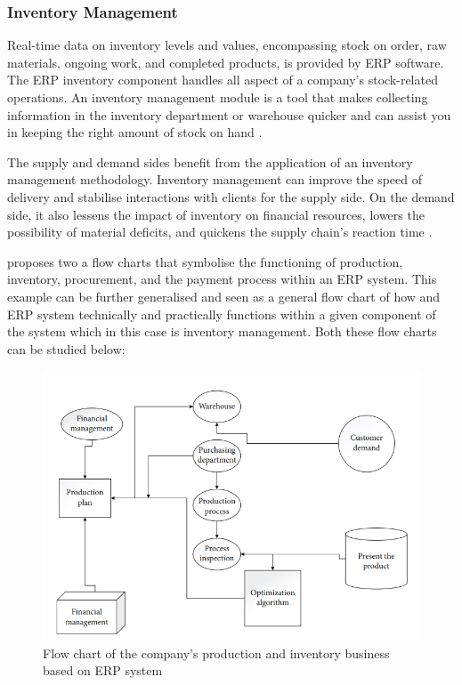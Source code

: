 \subsubsection{Inventory Management}
\par{Real-time data on inventory levels and values, encompassing stock on order, raw materials, ongoing work, and completed products, is provided by ERP software. The ERP inventory component handles all aspect of a company's stock-related operations. An inventory management module is a tool that makes collecting information in the inventory department or warehouse quicker and can assist you in keeping the right amount of stock on hand \citep{ahlawat2017role}.

The supply and demand sides benefit from the application of an inventory management methodology. Inventory management can improve the speed of delivery and stabilise interactions with clients for the supply side. On the demand side, it also lessens the impact of inventory on financial resources, lowers the possibility of material deficits, and quickens the supply chain's reaction time \citep{zhao2021research}.

\cite{zhao2021research} proposes two a flow charts that symbolise the functioning of production, inventory, procurement, and the payment process within an ERP system. This example can be further generalised and seen as a general flow chart of how and ERP system technically and practically functions within a given component of the system which in this case is inventory management. Both these flow charts can be studied below:}
\begin{figure}[ht!]
    \centering
    \includegraphics[width=1\linewidth]{img/rename flow chart of company's inventory and production.png}
    \caption{Flow chart of the company’s production and inventory business based on ERP system}
    \label{fig:enter-label}
\end{figure}
